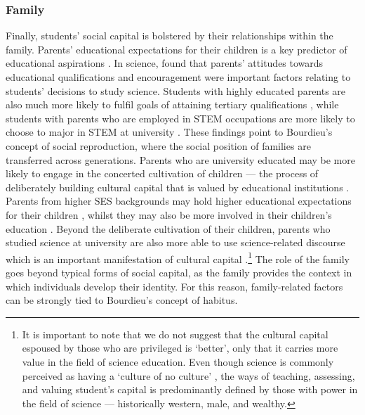 \subsubsection{Family}
Finally, students' social capital is bolstered by their relationships within the family. Parents' educational expectations for their children is a key predictor of educational aspirations \citep{wu2015early}. In science, \cite{Lyons_2006} found that parents' attitudes towards educational qualifications and encouragement were important factors relating to students' decisions to study science. Students with highly educated parents are also much more likely to fulfil goals of attaining tertiary qualifications \citep{reynolds2011change}, while students with parents who are employed in STEM occupations are more likely to choose to major in STEM at university \citep{moakler2014college}. These findings point to Bourdieu's concept of social reproduction, where the social position of families are transferred across generations. Parents who are university educated may be more likely to engage in the concerted cultivation of children --- the process of deliberately building cultural capital that is valued by educational institutions \citep{lareau2011unequal}. Parents from higher SES backgrounds may hold higher educational expectations for their children \citep{carolan2015does}, whilst they may also be more involved in their children's education \citep{cheadle2011quantitative}.  Beyond the deliberate cultivation of their children, parents who studied science at university are also more able to use science-related discourse which is an important manifestation of cultural capital \citep{Lyons_2006,bernstein1971class}.\footnote{It is important to note that we do not suggest that the cultural capital espoused by those who are privileged is `better', only that it carries more value in the field of science education. Even though science is commonly perceived as having a `culture of no culture' \citep{traweek2009beamtimes}, the ways of teaching, assessing, and valuing student's capital is predominantly defined by those with power in the field of science --- historically western, male, and wealthy.}  The role of the family goes beyond typical forms of social capital, as the family provides the context in which individuals develop their identity. For this reason, family-related factors can be strongly tied to Bourdieu's concept of habitus.  


